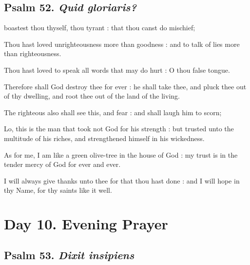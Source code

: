 \subsection{Psalm 52. \textit{Quid gloriaris?}}

 boastest thou thyself, thou tyrant : that thou canst do mischief;\par
{}
Thou hast loved unrighteousness more than goodness : and to talk of lies more than righteousness.\par
{}Thou hast loved to speak all words that may do hurt : O thou false tongue.\par
{}Therefore shall God destroy thee for ever : he shall take thee, and pluck thee out of thy dwelling, and root thee out of the land of the living.\par
{}The righteous also shall see this, and fear : and shall laugh him to scorn;\par
{}Lo, this is the man that took not God for his strength : but trusted unto the multitude of his riches, and strengthened himself in his wickedness.\par
{}As for me, I am like a green olive-tree in the house of God : my trust is in the tender mercy of God for ever and ever.\par
{}I will always give thanks unto thee for that thou hast done : and I will hope in thy Name, for thy saints like it well.\par

\section*{Day 10. Evening Prayer}

\subsection{Psalm 53. \textit{Dixit insipiens}}

